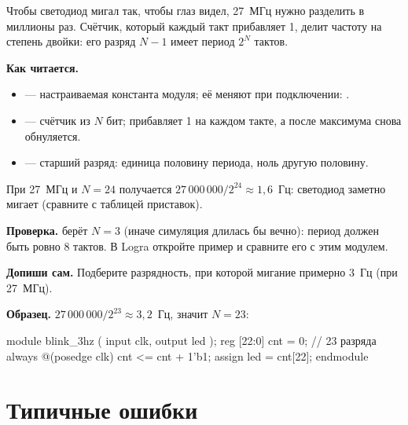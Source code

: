 Чтобы светодиод мигал так, чтобы глаз видел, 27~МГц нужно разделить в миллионы
раз. Счётчик, который каждый такт прибавляет 1, делит частоту на степень двойки:
его разряд $N-1$ имеет период $2^N$ тактов.


\textbf{Как читается.}
\begin{itemize}
  \item {} --- настраиваемая константа модуля; её меняют при подключении: .
  \item {} --- счётчик из $N$ бит;  прибавляет 1 на каждом такте, а после максимума снова обнуляется.
  \item {} --- старший разряд: единица половину периода, ноль другую половину.
\end{itemize}
При 27~МГц и $N=24$ получается $27\,000\,000/2^{24}\approx 1{,}6$~Гц:
светодиод заметно мигает (сравните с таблицей приставок).

\textbf{Проверка.}  берёт $N=3$ (иначе симуляция
длилась бы вечно): период должен быть ровно 8 тактов. В Logra откройте пример
 и сравните его с этим модулем.

\textbf{Допиши сам.} Подберите разрядность, при которой мигание примерно
3~Гц (при 27~МГц).

\textbf{Образец.} $27\,000\,000/2^{23}\approx 3{,}2$~Гц, значит $N=23$:
\begin{vcode}
module blink_3hz (
    input  clk,
    output led
);
    reg [22:0] cnt = 0;                   // 23 разряда
    always @(posedge clk) cnt <= cnt + 1'b1;
    assign led = cnt[22];
endmodule
\end{vcode}

\section{Типичные ошибки}

